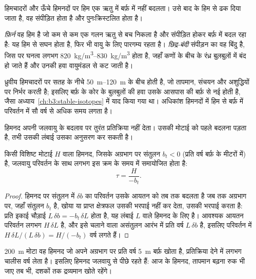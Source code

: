 हिमचादरों और ऊँचे हिमनदों पर हिम एक
ऋतु में बर्फ़ में नहीं बदलता। उसे बाद के हिम से ढक दिया जाता है, वह संपीड़ित होता है और पुनःक्रिस्टलित होता है।

\begin{definition}[फ़िर्न; छिद्र-बंदी]\label{def:b3:glaciology:firn}
\emph{फ़िर्न} वह हिम है जो कम से कम एक गलन ऋतु से बच निकला है
और संपीड़ित होकर बर्फ़ में बदल रहा है: यह हिम से सघन होता है, फिर भी वायु के लिए पारगम्य रहता है।
\emph{छिद्र-बंदी} संपीड़न का वह बिंदु है, जिस पर
घनत्व लगभग \qtyrange{820}{830}{kg/m^3} होता है, जहाँ कणों के बीच के रंध्र बुलबुलों में बंद हो जाते हैं
और उनकी हवा
वायुमंडल से कट जाती है।
\end{definition}

ध्रुवीय हिमचादरों पर 
सतह के नीचे \qtyrange{50}{120}{m} के बीच होती है, जो तापमान, संचयन और अशुद्धियों पर निर्भर करती है;
इसलिए बर्फ़ के कोर के बुलबुलों की हवा उसके आसपास की बर्फ़ से नई होती है,
जैसा अध्याय~\ref{ch:b3:stable-isotopes} में याद किया गया था।
अधिकांश हिमनदों में हिम से बर्फ़ में परिवर्तन में सौ वर्ष से अधिक समय लगता है।

हिमनद अपनी जलवायु के बदलाव पर तुरंत प्रतिक्रिया नहीं देता। उसकी मोटाई को पहले
बदलना पड़ता है, तभी उसकी लंबाई उसका अनुसरण कर सकती है।

\begin{proposition}[हिमनद प्रतिक्रिया-काल]\label{prop:b3:glaciology:response}
किसी विशिष्ट मोटाई $H$ वाला हिमनद, जिसके अग्रभाग पर संतुलन $b_t <
0$ (प्रति वर्ष बर्फ़ के मीटरों में) है, जलवायु परिवर्तन के साथ लगभग
इस क्रम के समय में समायोजित होता है:
\[
\tau = \frac{H}{-b_t} .
\]
\end{proposition}

\begin{proof}
हिमनद पर संतुलन में $\delta b$ का परिवर्तन उसके आयतन को तब तक बदलता है
जब तक अग्रभाग पर, जहाँ संतुलन $b_t$ है, खोया या प्राप्त क्षेत्रफल उसकी भरपाई नहीं कर देता,
उसकी भरपाई करता है: प्रति इकाई चौड़ाई $L\,\delta b = -b_t\,\delta L$ होता है,
यह लंबाई $L$ वाले हिमनद के लिए है। आवश्यक आयतन परिवर्तन लगभग $H\,\delta L$ है, और
इसे चलाने वाला असंतुलन आरंभ में प्रति वर्ष $L\,\delta b$ है, इसलिए
परिवर्तन में $H\,\delta L/(L\,\delta b) = H/(-b_t)$ वर्ष लगते हैं।
\end{proof}

\qty{200}{m} मोटा वह हिमनद जो अपने अग्रभाग पर प्रति वर्ष \qty{5}{m} बर्फ़ खोता है,
प्रतिक्रिया देने में लगभग चालीस वर्ष लेता है। इसलिए हिमनद जलवायु से पीछे रहते हैं:
आज के हिमनद, तापमान बढ़ना रुक भी जाए तब भी,
दशकों तक द्रव्यमान खोते रहेंगे।

